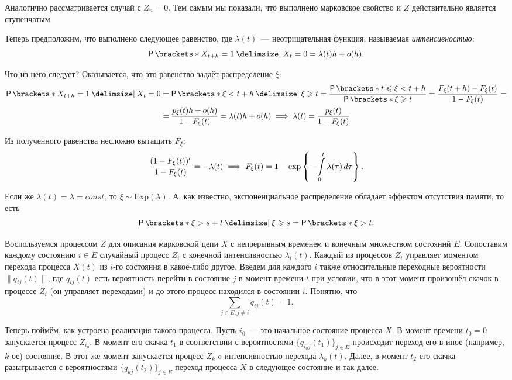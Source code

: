Аналогично рассматривается случай с \(Z_{n} = 0\). Тем самым мы показали, что 
выполнено марковское свойство и \(Z\) действительно является ступенчатым.

Теперь предположим, что выполнено следующее равенство, где \(\lambda(t)\)~--- 
неотрицательная функция, называемая \emph{интенсивностью}:
\[
	\Pr{X_{t + h} = 1 \given X_{t} = 0} = \lambda(t)h + o(h).
\]

Что из него следует? Оказывается, что это равенство задаёт распределение 
\(\xi\):
\begin{align*}
	\Pr{X_{t + h} = 1 \given X_{t} = 0} &= \Pr{\xi < t + h \given \xi \geq t} = 
	\frac{\Pr{t \leq \xi < t + h}}{\Pr{\xi \geq t}} = \frac{F_{\xi}(t + h) - 
	F_{\xi}(t)}{1 - F_{\xi}(t)} = \\ 
	&= \frac{p_{\xi}(t)h + o(h)}{1 - F_{\xi}(t)} = \lambda(t)h + o(h) \implies 
	\lambda(t) = \frac{p_{\xi}(t)}{1 - F_{\xi}(t)}
\end{align*}

Из полученного равенства несложно вытащить \(F_{\xi}\):
\[
	\frac{(1 - F_{\xi}(t))'}{1 - F_{\xi}(t)} = -\lambda(t) \implies F_{\xi}(t) 
	= 1 - \exp\left\{-\int\limits_{0}^{t}\lambda(\tau)\mathop{}\!d \tau\right\}.
\]

Если же \(\lambda(t) = \lambda = const\), то \(\xi \sim 
\mathrm{Exp}(\lambda)\). А, как известно, экспоненциальное распределение 
обладает эффектом отсутствия памяти, то есть
\[
	\Pr{\xi > s + t \given \xi \geq s} = \Pr{\xi > t}.
\]

Воспользуемся процессом \(Z\) для описания марковской цепи \(X\) с непрерывным 
временем и конечным множеством состояний \(E\). Сопоставим каждому состоянию 
\(i \in E\) случайный процесс \(Z_{i}\) с конечной интенсивностью 
\(\lambda_{i}(t)\). Каждый из процессов \(Z_{i}\) управляет моментом перехода 
процесса \(X(t)\) из \(i\)-го состояния в какое-либо другое. Введем для каждого 
\(i\) также относительные переходные вероятности \(\|q_{ij}(t)\|\), где 
\(q_{ij}(t)\) есть вероятность перейти в состояние \(j\) в момент времени \(t\) 
при условии, что в этот момент произошёл скачок в процессе \(Z_{i}\) (он 
управляет переходами) и до этого процесс находился в состоянии \(i\). Понятно, 
что
\[
	\sum_{j \in E, j \neq i} q_{ij}(t) = 1.
\]

Теперь поймём, как устроена реализация такого процесса. Пусть \(i_{0}\)~--- это 
начальное состояние процесса \(X\). В момент времени \(t_{0} = 0\) запускается 
процесс \(Z_{i_{0}}\). В момент его скачка \(t_{1}\) в соответствии с 
вероятностями \(\{q_{i_{0}j}(t_{1})\}_{j \in E}\) происходит переход его в иное 
(например, \(k\)-ое) состояние. В этот же момент запускается процесс \(Z_{k}\) 
c интенсивностью перехода \(\lambda_{k}(t)\). Далее, в момент \(t_{2}\) его 
скачка разыгрывается с вероятностями \(\{q_{kj}(t_{2})\}_{j \in E}\) переход 
процесса \(X\) в следующее состояние и так далее.

